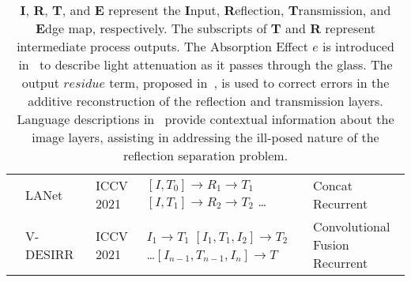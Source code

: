 \begin{table*}
\begin{tabular}{lllll}
& LANet~\cite{dong2021location} & ICCV 2021 & \shortstack[l]{\space \\ $[I, T_{0}] \rightarrow R_{1} \rightarrow T_{1}$ \\ $[I, T_{1}] \rightarrow R_{2} \rightarrow T_{2}$ \\ \ldots} & \shortstack[l]{Concat \\ Recurrent} \\ \cline{2-5}
& V-DESIRR~\cite{prasad2021v} & ICCV 2021 & \shortstack[l]{\space \\ $I_{1} \rightarrow T_{1}$ \\ $[I_{1}, T_{1}, I_{2}] \rightarrow T_{2}$ \\ \ldots \\ $[I_{n-1}, T_{n-1}, I_{n}] \rightarrow T$ } & \shortstack[l]{Convolutional Fusion \\ Recurrent} \\
\hline\hline
\end{tabular}
\caption{\textbf{I}, \textbf{R}, \textbf{T}, and \textbf{E} represent the \textbf{I}nput, \textbf{R}eflection, \textbf{T}ransmission, and \textbf{E}dge map, respectively. The subscripts of \textbf{T} and \textbf{R} represent intermediate process outputs. The Absorption Effect $e$ is introduced in~\cite{zheng2021single} to describe light attenuation as it passes through the glass. The output $residue$ term, proposed in~\cite{hu2023single}, is used to correct errors in the additive reconstruction of the reflection and transmission layers. Language descriptions in~\cite{zhong2024language} provide contextual information about the image layers, assisting in addressing the ill-posed nature of the reflection separation problem.}
\label{tab:1}
\end{table*}

